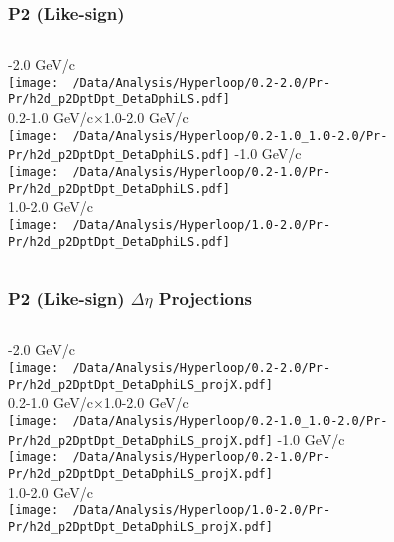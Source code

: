 \documentclass{beamer}
\begin{document}
\begin{frame}
	\frametitle{P2 (Like-sign)}
	\begin{columns}
		-2.0 GeV/c\\
		\texttt{[image: ~/Data/Analysis/Hyperloop/0.2-2.0/Pr-Pr/h2d\_p2DptDpt\_DetaDphiLS.pdf]}\\0.2-1.0 GeV/c$\times$1.0-2.0 GeV/c\\
		\texttt{[image: ~/Data/Analysis/Hyperloop/0.2-1.0\_1.0-2.0/Pr-Pr/h2d\_p2DptDpt\_DetaDphiLS.pdf]}
		-1.0 GeV/c\\
		\texttt{[image: ~/Data/Analysis/Hyperloop/0.2-1.0/Pr-Pr/h2d\_p2DptDpt\_DetaDphiLS.pdf]}\\1.0-2.0 GeV/c\\
		\texttt{[image: ~/Data/Analysis/Hyperloop/1.0-2.0/Pr-Pr/h2d\_p2DptDpt\_DetaDphiLS.pdf]}
	\end{columns}
\end{frame}
\begin{frame}
	\frametitle{P2 (Like-sign) $\Delta\eta$ Projections}
	\begin{columns}
		\column{0.5\textwidth}
		-2.0 GeV/c\\
		\texttt{[image: ~/Data/Analysis/Hyperloop/0.2-2.0/Pr-Pr/h2d\_p2DptDpt\_DetaDphiLS\_projX.pdf]}\\0.2-1.0 GeV/c$\times$1.0-2.0 GeV/c\\
		\texttt{[image: ~/Data/Analysis/Hyperloop/0.2-1.0\_1.0-2.0/Pr-Pr/h2d\_p2DptDpt\_DetaDphiLS\_projX.pdf]}
		\column{0.5\textwidth}
		-1.0 GeV/c\\
		\texttt{[image: ~/Data/Analysis/Hyperloop/0.2-1.0/Pr-Pr/h2d\_p2DptDpt\_DetaDphiLS\_projX.pdf]}\\1.0-2.0 GeV/c\\
		\texttt{[image: ~/Data/Analysis/Hyperloop/1.0-2.0/Pr-Pr/h2d\_p2DptDpt\_DetaDphiLS\_projX.pdf]}
	\end{columns}
\end{frame}
\end{document}
